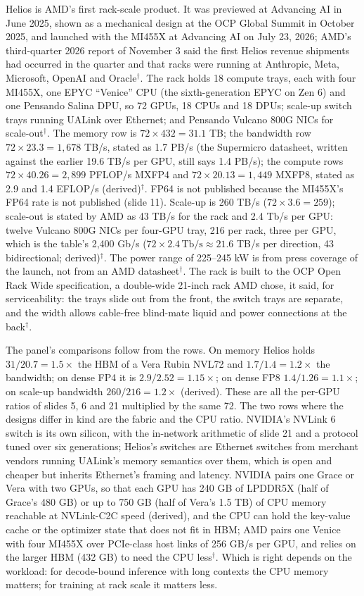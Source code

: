 \documentclass[11pt,letterpaper]{article}
\begin{document}
Helios is AMD's first rack-scale product. It was previewed at Advancing AI in June 2025, shown as a mechanical design at the OCP Global Summit in October 2025, and launched with the MI455X at Advancing AI on July 23, 2026; AMD's third-quarter 2026 report of November 3 said the first Helios revenue shipments had occurred in the quarter and that racks were running at Anthropic, Meta, Microsoft, OpenAI and Oracle$^\dagger$. The rack holds 18 compute trays, each with four MI455X, one EPYC ``Venice'' CPU (the sixth-generation EPYC on Zen 6) and one Pensando Salina DPU, so 72 GPUs, 18 CPUs and 18 DPUs; scale-up switch trays running UALink over Ethernet; and Pensando Vulcano 800G NICs for scale-out$^\dagger$. The memory row is $72 \times 432 = 31.1$ TB; the bandwidth row $72 \times 23.3 = 1{,}678$ TB/s, stated as 1.7 PB/s (the Supermicro datasheet, written against the earlier 19.6 TB/s per GPU, still says 1.4 PB/s); the compute rows $72 \times 40.26 = 2{,}899$ PFLOP/s MXFP4 and $72 \times 20.13 = 1{,}449$ MXFP8, stated as 2.9 and 1.4 EFLOP/s (derived)$^\dagger$. FP64 is not published because the MI455X's FP64 rate is not published (slide 11). Scale-up is 260 TB/s ($72 \times 3.6 = 259$); scale-out is stated by AMD as 43 TB/s for the rack and 2.4 Tb/s per GPU: twelve Vulcano 800G NICs per four-GPU tray, 216 per rack, three per GPU, which is the table's 2{,}400 Gb/s ($72 \times 2.4\,\text{Tb/s} \approx 21.6$ TB/s per direction, 43 bidirectional; derived)$^\dagger$. The power range of 225--245 kW is from press coverage of the launch, not from an AMD datasheet$^\dagger$. The rack is built to the OCP Open Rack Wide specification, a double-wide 21-inch rack AMD chose, it said, for serviceability: the trays slide out from the front, the switch trays are separate, and the width allows cable-free blind-mate liquid and power connections at the back$^\dagger$.

The panel's comparisons follow from the rows. On memory Helios holds $31/20.7 = 1.5\times$ the HBM of a Vera Rubin NVL72 and $1.7/1.4 = 1.2\times$ the bandwidth; on dense FP4 it is $2.9/2.52 = 1.15\times$; on dense FP8 $1.4/1.26 = 1.1\times$; on scale-up bandwidth $260/216 = 1.2\times$ (derived). These are all the per-GPU ratios of slides 5, 6 and 21 multiplied by the same 72. The two rows where the designs differ in kind are the fabric and the CPU ratio. NVIDIA's NVLink 6 switch is its own silicon, with the in-network arithmetic of slide 21 and a protocol tuned over six generations; Helios's switches are Ethernet switches from merchant vendors running UALink's memory semantics over them, which is open and cheaper but inherits Ethernet's framing and latency. NVIDIA pairs one Grace or Vera with two GPUs, so that each GPU has 240 GB of LPDDR5X (half of Grace's 480 GB) or up to 750 GB (half of Vera's 1.5 TB) of CPU memory reachable at NVLink-C2C speed (derived), and the CPU can hold the key-value cache or the optimizer state that does not fit in HBM; AMD pairs one Venice with four MI455X over PCIe-class host links of 256 GB/s per GPU, and relies on the larger HBM (432 GB) to need the CPU less$^\dagger$. Which is right depends on the workload: for decode-bound inference with long contexts the CPU memory matters; for training at rack scale it matters less.
\end{document}
